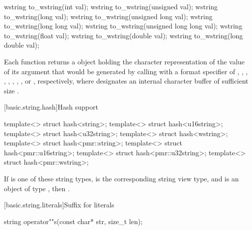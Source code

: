 %
\begin{itemdecl}
wstring to_wstring(int val);
wstring to_wstring(unsigned val);
wstring to_wstring(long val);
wstring to_wstring(unsigned long val);
wstring to_wstring(long long val);
wstring to_wstring(unsigned long long val);
wstring to_wstring(float val);
wstring to_wstring(double val);
wstring to_wstring(long double val);
\end{itemdecl}

\begin{itemdescr}
\pnum
\returns Each function returns a  object holding the character
representation of the value of its argument that would be generated by calling
 with a format specifier of
,
,
,
,
,
,
,
,
or , respectively, where  designates an
internal character buffer of sufficient size .
\end{itemdescr}

[basic.string.hash]{Hash support}

%
%
%
%
%
%
%
%
\begin{itemdecl}
template<> struct hash<string>;
template<> struct hash<u16string>;
template<> struct hash<u32string>;
template<> struct hash<wstring>;
template<> struct hash<pmr::string>;
template<> struct hash<pmr::u16string>;
template<> struct hash<pmr::u32string>;
template<> struct hash<pmr::wstring>;
\end{itemdecl}

\begin{itemdescr}
\pnum
If  is one of these string types,
 is the corresponding string view type, and
 is an object of type ,
then .
\end{itemdescr}

[basic.string.literals]{Suffix for  literals}

%
\begin{itemdecl}
string operator""s(const char* str, size_t len);
\end{itemdecl}

